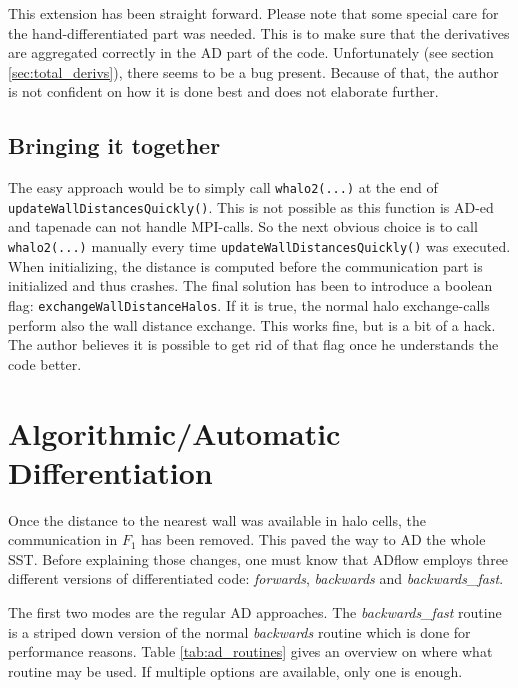 This extension has been straight forward. Please note that some special care
for the hand-differentiated part was needed. This is to make sure that the
derivatives are aggregated correctly in the AD part of the code. Unfortunately
(see section \ref{sec:total_derivs}), there seems to be a bug present. Because
of that, the author is not confident on how it is done best and does not
elaborate further.




\subsection{Bringing it together}
The easy approach would be to simply call \texttt{whalo2(...)} at the end of
\texttt{updateWallDistancesQuickly()}. This is not possible as this function is
AD-ed and tapenade can not handle MPI-calls. So the next obvious choice is to
call \texttt{whalo2(...)} manually every time
\texttt{updateWallDistancesQuickly()} was executed. When initializing, the
distance is computed before the communication part is initialized and thus
crashes. The final solution has been to introduce a boolean flag:
\texttt{exchangeWallDistanceHalos}. If it is true, the normal halo
exchange-calls perform also the wall distance exchange. This works fine, but is
a bit of a hack. The author believes it is possible to get rid of that flag
once he understands the code better.








\section{Algorithmic/Automatic Differentiation}
\label{sec:ad}
Once the distance to the nearest wall was available in halo cells, the
communication in $F_1$ has been removed. This paved the way to AD the whole
SST. Before explaining those changes, one must know that ADflow employs three
different versions of differentiated code: \textit{forwards},
\textit{backwards} and \textit{backwards\_fast}. 

The first two modes are the regular AD approaches. The \textit{backwards\_fast}
routine is a striped down version of the normal \textit{backwards} routine
which is done for performance reasons. Table \ref{tab:ad_routines} gives an
overview on where what routine may be used. If multiple options are available,
only one is enough.

